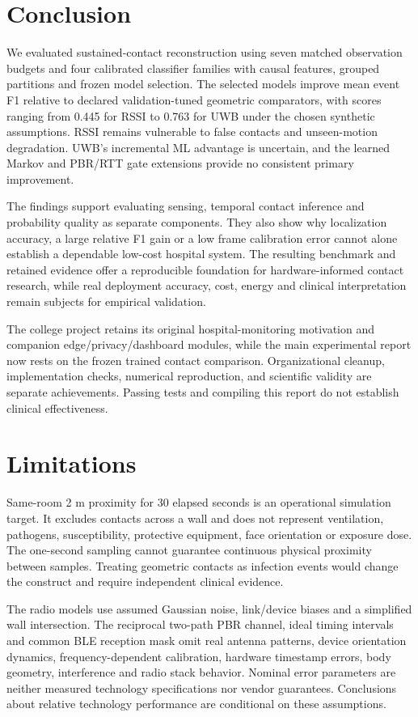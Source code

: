 \documentclass[12pt,a4paper]{report}
\begin{document}
\section{Conclusion}
We evaluated sustained-contact reconstruction using seven matched observation budgets and four calibrated classifier families with causal features, grouped partitions and frozen model selection. The selected models improve mean event F1 relative to declared validation-tuned geometric comparators, with scores ranging from 0.445 for RSSI to 0.763 for UWB under the chosen synthetic assumptions. RSSI remains vulnerable to false contacts and unseen-motion degradation. UWB's incremental ML advantage is uncertain, and the learned Markov and PBR/RTT gate extensions provide no consistent primary improvement.

The findings support evaluating sensing, temporal contact inference and probability quality as separate components. They also show why localization accuracy, a large relative F1 gain or a low frame calibration error cannot alone establish a dependable low-cost hospital system. The resulting benchmark and retained evidence offer a reproducible foundation for hardware-informed contact research, while real deployment accuracy, cost, energy and clinical interpretation remain subjects for empirical validation.

The college project retains its original hospital-monitoring motivation and companion edge/privacy/dashboard modules, while the main experimental report now rests on the frozen trained contact comparison. Organizational cleanup, implementation checks, numerical reproduction, and scientific validity are separate achievements. Passing tests and compiling this report do not establish clinical effectiveness.

\section{Limitations}
Same-room 2 m proximity for 30 elapsed seconds is an operational simulation target. It excludes contacts across a wall and does not represent ventilation, pathogens, susceptibility, protective equipment, face orientation or exposure dose. The one-second sampling cannot guarantee continuous physical proximity between samples. Treating geometric contacts as infection events would change the construct and require independent clinical evidence.

The radio models use assumed Gaussian noise, link/device biases and a simplified wall intersection. The reciprocal two-path PBR channel, ideal timing intervals and common BLE reception mask omit real antenna patterns, device orientation dynamics, frequency-dependent calibration, hardware timestamp errors, body geometry, interference and radio stack behavior. Nominal error parameters are neither measured technology specifications nor vendor guarantees. Conclusions about relative technology performance are conditional on these assumptions.
\end{document}
